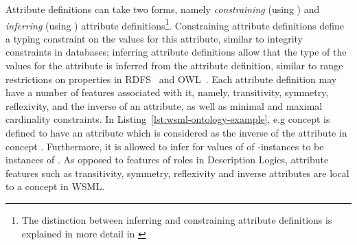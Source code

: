 Attribute definitions can take two forms, namely \emph{constraining}
(using ) and \emph{inferring} (using
) attribute definitions\footnote{The distinction
  between inferring and constraining attribute definitions is
  explained in more detail in \cite[Section
  2]{Bruijn+PolleresETAL-:05}}. Constraining attribute definitions
define a typing constraint on the values for this attribute, similar
to integrity constraints in databases; inferring attribute
definitions allow that the type of the values for the attribute is
inferred from the attribute definition, similar to range
restrictions on properties in
RDFS~\cite{Brickley+Guha-VocaDescLang:03} and
OWL~\cite{Dean+Schreiber-OntoLangRefe:04}.  Each attribute
definition may have a number of features associated with it, namely,
transitivity, symmetry, reflexivity, and the inverse of an
attribute, as well as minimal and maximal cardinality constraints.
In Listing~\ref{lst:wsml-ontology-example}, e.g concept 
is defined to have an attribute  which is
considered as the inverse of the attribute  in concept .
Furthermore, it is allowed to infer for values of  of
-instances to be instances of .
As opposed to features of roles in Description Logics, attribute features
such as transitivity, symmetry, reflexivity and inverse attributes are local
to a concept in WSML.

